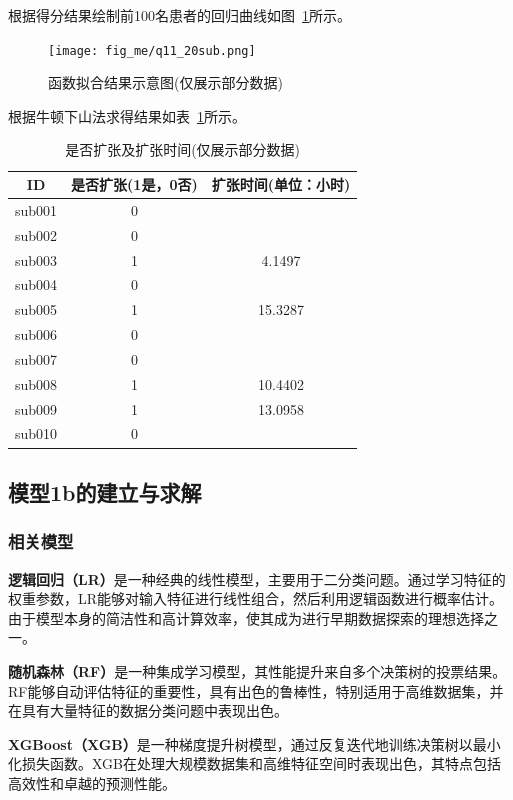 \documentclass[bwprint]{gmcmthesis}
\begin{document}
根据得分结果绘制前100名患者的回归曲线如图~\ref{函数拟合结果示意图}所示。
\begin{figure}[!h]
\centering
\texttt{[image: fig\_me/q11\_20sub.png]}
\caption{函数拟合结果示意图(仅展示部分数据)}
\label{函数拟合结果示意图}
\end{figure}

根据牛顿下山法求得结果如表~\ref{是否扩张及扩张时间}所示。
\begin{table}[!ht]
    \centering
    \caption{是否扩张及扩张时间(仅展示部分数据)}
    \begin{tabular}{ccc}
    \hline
        ID & 是否扩张(1是，0否) & 扩张时间(单位：小时) \\ \hline
        sub001 & 0 & ~ \\ 
        sub002 & 0 & ~ \\ 
        sub003 & 1 & 4.1497 \\ 
        sub004 & 0 & ~ \\ 
        sub005 & 1 & 15.3287 \\ 
        sub006 & 0 & ~ \\ 
        sub007 & 0 & ~ \\ 
        sub008 & 1 & 10.4402 \\ 
        sub009 & 1 & 13.0958 \\ 
        sub010 & 0 \\ \hline
    \end{tabular}
    \label{是否扩张及扩张时间}
\end{table}

\subsection{模型1b的建立与求解}
\subsubsection{相关模型}

\textbf{逻辑回归（LR）}\cite{Christodoulou2019ASR}是一种经典的线性模型，主要用于二分类问题。通过学习特征的权重参数，LR能够对输入特征进行线性组合，然后利用逻辑函数进行概率估计。由于模型本身的简洁性和高计算效率，使其成为进行早期数据探索的理想选择之一。

\textbf{随机森林（RF）}\cite{Keith2020RandomF}是一种集成学习模型，其性能提升来自多个决策树的投票结果。RF能够自动评估特征的重要性，具有出色的鲁棒性，特别适用于高维数据集，并在具有大量特征的数据分类问题中表现出色。

\textbf{XGBoost（XGB）}\cite{Ogunleye2020XGBoostMF}是一种梯度提升树模型，通过反复迭代地训练决策树以最小化损失函数。XGB在处理大规模数据集和高维特征空间时表现出色，其特点包括高效性和卓越的预测性能。
\end{document}
